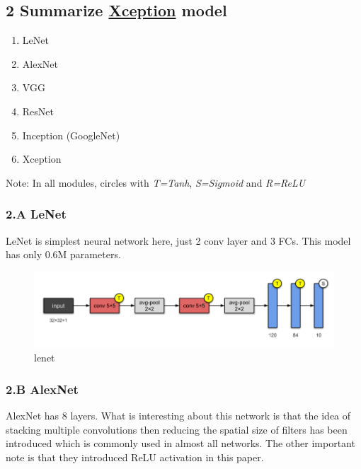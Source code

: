 \documentclass[11pt]{article}
\makeatletter
\def\maxwidth{\ifdim\Gin@nat@width>\linewidth\linewidth
    \else\Gin@nat@width\fi}
\let\Oldincludegraphics\includegraphics
\renewcommand{\includegraphics}[1]{\Oldincludegraphics[width=.8\maxwidth]{#1}}
\providecommand{\tightlist}{%
      \setlength{\itemsep}{0pt}\setlength{\parskip}{0pt}}
\makeatother
\begin{document}
    \hypertarget{summarize-xception-model}{%
\subsection{\texorpdfstring{2 Summarize
\href{http://openaccess.thecvf.com/content_cvpr_2017/papers/Chollet_Xception_Deep_Learning_CVPR_2017_paper.pdf}{Xception}
model}{2 Summarize Xception model}}\label{summarize-xception-model}}

\begin{enumerate}
\def\labelenumi{\arabic{enumi}.}
\tightlist
\item
  LeNet
\item
  AlexNet
\item
  VGG
\item
  ResNet
\item
  Inception (GoogleNet)
\item
  Xception
\end{enumerate}

Note: In all modules, circles with \emph{T=Tanh}, \emph{S=Sigmoid} and
\emph{R=ReLU}

    \hypertarget{a-lenet}{%
\subsubsection{2.A LeNet}\label{a-lenet}}

LeNet is simplest neural network here, just 2 conv layer and 3 FCs. This
model has only 0.6M parameters.

\begin{figure}
\centering
\includegraphics{wiki/2_1.png}
\caption{lenet}
\end{figure}

    \hypertarget{b-alexnet}{%
\subsubsection{2.B AlexNet}\label{b-alexnet}}

AlexNet has 8 layers. What is interesting about this network is that the
idea of stacking multiple convolutions then reducing the spatial size of
filters has been introduced which is commonly used in almost all
networks. The other important note is that they introduced ReLU
activation in this paper.
\end{document}
